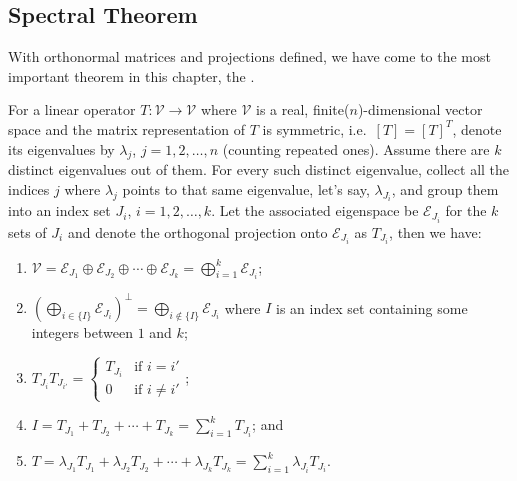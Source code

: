 \subsection{Spectral Theorem}
With orthonormal matrices and projections defined, we have come to the most important theorem in this chapter, the .
\begin{thm}
\label{thm:spectral}
For a linear operator $T: \mathcal{V} \to \mathcal{V}$ where $\mathcal{V}$ is a real, finite($n$)-dimensional vector space and the matrix representation of $T$ is symmetric, i.e.\ $[T]=[T]^T$, denote its eigenvalues by $\lambda_j$, $j = 1,2,\ldots,n$ (counting repeated ones). Assume there are $k$ distinct eigenvalues out of them. For every such distinct eigenvalue, collect all the indices $j$ where $\lambda_j$ points to that same eigenvalue, let's say, $\lambda_{J_i}$, and group them into an index set $J_i$, $i = 1,2,\ldots,k$. Let the associated eigenspace be $\mathcal{E}_{J_i}$ for the $k$ sets of $J_i$ and denote the orthogonal projection onto $\mathcal{E}_{J_i}$ as $T_{J_i}$, then we have:
\begin{enumerate}[label=(\alph*)]
\item $\mathcal{V} = \mathcal{E}_{J_1} \oplus \mathcal{E}_{J_2} \oplus \cdots \oplus \mathcal{E}_{J_k} = \bigoplus_{i=1}^{k} \mathcal{E}_{J_i}$;
\item $(\bigoplus_{i \in \{I\}} \mathcal{E}_{J_i})^\perp = \bigoplus_{i \notin \{I\}} \mathcal{E}_{J_i}$ where $I$ is an index set containing some integers between $1$ and $k$;
\item $T_{J_i} T_{J_{i'}} = 
\begin{cases}
T_{J_i} & \text{if $i = i'$} \\
0 & \text{if $i \neq i'$}
\end{cases}$;
\item $I = T_{J_1} + T_{J_2} + \cdots + T_{J_k} = \sum_{i=1}^{k} T_{J_i}$; and
\item $T = \lambda_{J_1}T_{J_1} + \lambda_{J_2}T_{J_2} + \cdots + \lambda_{J_k}T_{J_k} = \sum_{i=1}^{k} \lambda_{J_i}T_{J_i}$.
\end{enumerate}
\end{thm}
